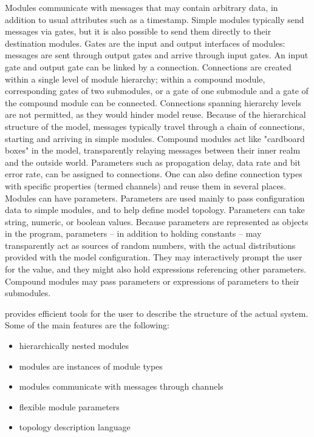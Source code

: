 Modules communicate with messages that may contain arbitrary
data, in addition to usual attributes such as a timestamp.
Simple modules typically send messages via gates, but it is also
possible to send them directly to their destination modules. Gates are the
input and output interfaces of modules: messages are sent through
output gates and arrive through input gates. An input gate and output gate
can be linked by a connection. Connections are created within a single
level of module hierarchy; within a compound module, corresponding gates of
two submodules, or a gate of one submodule and a gate of the compound
module can be connected. Connections spanning hierarchy levels are
not permitted, as they would hinder model reuse. Because of the hierarchical
structure of the model, messages typically travel through a chain of
connections, starting and arriving in simple modules. Compound modules act like
"cardboard boxes" in the model, transparently relaying messages between
their inner realm and the outside world. Parameters such as propagation delay,
data rate and bit error rate, can be assigned to connections. One can also
define connection types with specific properties (termed channels) and
reuse them in several places. Modules can have parameters. Parameters are
used mainly to pass configuration data to simple modules, and to help
define model topology. Parameters can take string, numeric, or boolean
values. Because parameters are represented as objects in the program,
parameters -- in addition to holding constants -- may transparently act as
sources of random numbers, with the actual distributions provided with the
model configuration. They may interactively prompt the user for the value,
and they might also hold expressions referencing other parameters. Compound
modules may pass parameters or expressions of parameters to their
submodules.


{\opp} provides efficient tools for the user to describe the
structure of the actual system. Some of the main features are the following:
\begin{itemize}
\item{hierarchically nested modules}
\item{modules are instances of module types}
\item{modules communicate with messages through channels}
\item{flexible module parameters}
\item{topology description language}
\end{itemize}

